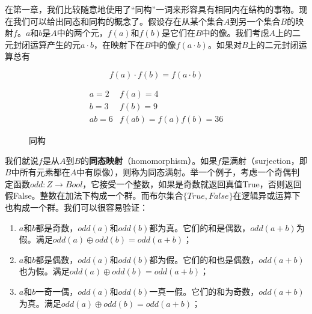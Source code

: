 \documentclass[b5paper]{ctexart}
\begin{document}
在第一章，我们比较随意地使用了“同构”一词来形容具有相同内在结构的事物。现在我们可以给出同态和同构的概念了。假设存在从某个集合$A$到另一个集合$B$的映射$f$。$a$和$b$是$A$中的两个元，$f(a)$和$f(b)$是它们在$B$中的像。我们考虑$A$上的二元封闭运算产生的元$a \cdot b$，在映射下在$B$中的像$f(a \cdot b)$。如果对$B$上的二元封闭运算总有

\[
f(a) \cdot f(b) = f(a \cdot b)
\]

\begin{figure}[htbp]
\centering
{}
\[
\begin{array}{rl}
a = 2 & f(a) = 4 \\
b = 3 & f(b) = 9 \\
ab = 6 & f(ab) = f(a)f(b) = 36
\end{array}
\]
\caption{同构}
\label{fig:isomorphism}
\end{figure}

我们就说$f$是从$A$到$B$的\textbf{同态映射}（homomorphism）。如果$f$是满射（surjection，即$B$中所有元素都在$A$中有原像），则称为同态满射。举一个例子，考虑一个奇偶判定函数$odd: Z \to Bool$，它接受一个整数，如果是奇数就返回真值True，否则返回假False。整数在加法下构成一个群。而布尔集合$\{True, False\}$在逻辑异或运算下也构成一个群。我们可以很容易验证：

\begin{enumerate}
\item $a$和$b$都是奇数，$odd(a)$和$odd(b)$都为真。它们的和是偶数，$odd(a+b)$为假。满足$odd(a) \oplus odd(b) = odd(a+b)$；
\item $a$和$b$都是偶数，$odd(a)$和$odd(b)$都为假。它们的和也是偶数，$odd(a+b)$也为假。满足$odd(a) \oplus odd(b) = odd(a+b)$；
\item $a$和$b$一奇一偶，$odd(a)$和$odd(b)$一真一假。它们的和为奇数，$odd(a+b)$为真。满足$odd(a) \oplus odd(b) = odd(a+b)$；
\end{enumerate}
\end{document}
